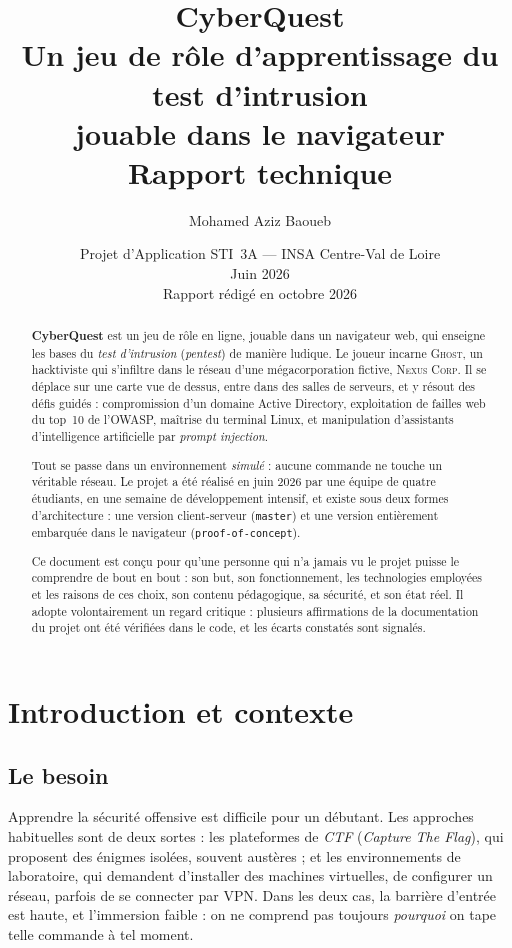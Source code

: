 \documentclass[11pt,a4paper]{report}
\title{%
  \vspace{-1.5cm}
  {\Huge\bfseries CyberQuest}\\[0.4cm]
  {\Large Un jeu de r\^ole d'apprentissage du test d'intrusion\\jouable dans le navigateur}\\[1.2cm]
  {\large Rapport technique}
}
\author{Mohamed Aziz Baoueb}
\date{Projet d'Application STI~3A --- INSA Centre-Val de Loire\\
Juin 2026\\[0.6cm]
\small Rapport r\'edig\'e en octobre 2026}
\newcommand{\code}[1]{\texttt{\nolinkurl{#1}}}
\begin{document}
\maketitle
\thispagestyle{empty}

\begin{abstract}
\noindent
\textbf{CyberQuest} est un jeu de r\^ole en ligne, jouable dans un navigateur web,
qui enseigne les bases du \emph{test d'intrusion} (\emph{pentest}) de mani\`ere
ludique. Le joueur incarne \textsc{Ghost}, un hacktiviste qui s'infiltre dans le
r\'eseau d'une m\'egacorporation fictive, \textsc{Nexus Corp}. Il se d\'eplace sur une
carte vue de dessus, entre dans des salles de serveurs, et y r\'esout des d\'efis
guid\'es : compromission d'un domaine Active Directory, exploitation de failles web
du top~10 de l'OWASP, ma\^itrise du terminal Linux, et manipulation d'assistants
d'intelligence artificielle par \emph{prompt injection}.

Tout se passe dans un environnement \emph{simul\'e} : aucune commande ne touche un
v\'eritable r\'eseau. Le projet a \'et\'e r\'ealis\'e en juin 2026 par une \'equipe de quatre
\'etudiants, en une semaine de d\'eveloppement intensif, et existe sous deux formes
d'architecture : une version client-serveur (\code{master}) et une version
enti\`erement embarqu\'ee dans le navigateur (\code{proof-of-concept}).

Ce document est con\c cu pour qu'une personne qui n'a jamais vu le projet puisse le
comprendre de bout en bout : son but, son fonctionnement, les technologies
employ\'ees et les raisons de ces choix, son contenu p\'edagogique, sa s\'ecurit\'e, et
son \'etat r\'eel. Il adopte volontairement un regard critique : plusieurs
affirmations de la documentation du projet ont \'et\'e v\'erifi\'ees dans le code, et les
\'ecarts constat\'es sont signal\'es.
\end{abstract}

\tableofcontents

\chapter{Introduction et contexte}

\section{Le besoin}

Apprendre la s\'ecurit\'e offensive est difficile pour un d\'ebutant. Les approches
habituelles sont de deux sortes : les plateformes de \emph{CTF} (\emph{Capture The
Flag}), qui proposent des \'enigmes isol\'ees, souvent austères ; et les environnements
de laboratoire, qui demandent d'installer des machines virtuelles, de configurer un
r\'eseau, parfois de se connecter par VPN. Dans les deux cas, la barri\`ere d'entr\'ee
est haute, et l'immersion faible : on ne comprend pas toujours \emph{pourquoi} on tape
telle commande \`a tel moment.
\end{document}
